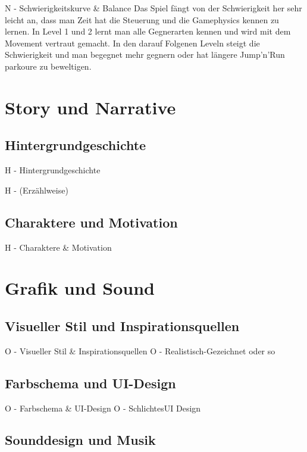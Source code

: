 \documentclass[oneside]{ausarbeitung}
\begin{document}
N - Schwierigkeitskurve & Balance
Das Spiel fängt von der Schwierigkeit her sehr leicht an, dass man Zeit hat die Steuerung und die Gamephysics kennen zu lernen. 
In Level 1 und 2 lernt man alle Gegnerarten kennen und wird mit dem Movement vertraut gemacht. 
In den darauf Folgenen Leveln steigt die Schwierigkeit und man begegnet mehr gegnern oder hat längere Jump'n'Run parkoure zu beweltigen. 


\chapter{Story und Narrative}

\section{Hintergrundgeschichte}

H - Hintergrundgeschichte


H - (Erzählweise)


\section{Charaktere und Motivation}

H - Charaktere & Motivation


\chapter{Grafik und Sound}

\section{Visueller Stil und Inspirationsquellen}

O - Visueller Stil & Inspirationsquellen
O   - Realistisch-Gezeichnet oder so


\section{Farbschema und UI-Design}

O - Farbschema & UI-Design
O   - SchlichtesUI Design


\section{Sounddesign und Musik}
\end{document}
